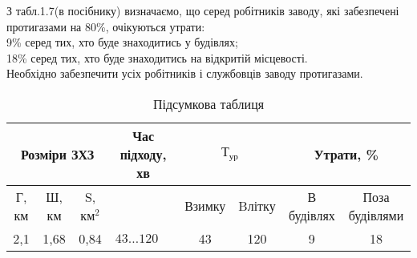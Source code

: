 \documentclass[a4paper,14pt]{extreport}
\begin{document}
З табл.1.7(в посібнику) визначаємо, що серед робітників заводу, які забезпечені протигазами на 80\%, очікуються утрати:\\

9\% серед тих, хто буде знаходитись у будівлях;\\

18\% серед тих, хто буде знаходитись на відкритій місцевості.\\

Необхідно забезпечити усіх робітників і службовців заводу
протигазами.






\begin{landscape}

\begin{table}[h]
\begin{center}
\begin{tabular}{|c|c|c|cc|c|c|c|c|}
\hline
\multicolumn{3}{|c|}{Розміри ЗХЗ}   & \multicolumn{2}{c|}{Час підходу, хв}    & \multicolumn{2}{c|}{$\text{Т}_{\text{ур}}$} & \multicolumn{2}{c|}{Утрати, \%} \\ \hline
  Г, км    &   Ш, км   &   S, км$^2$& \multicolumn{2}{c|}{}     &    Взимку       &     Bлітку      &    В будівлях       &      Поза будівлями     \\ \hline
     2,1   &   1,68    &   0,84     & \multicolumn{1}{c}{$43\dots120$}   &          &     43      &    120     &    9     & 18  \\ \hline
\end{tabular}
\end{center}

\caption{Підсумкова таблиця}
\end{table}
\end{landscape}
\end{document}
